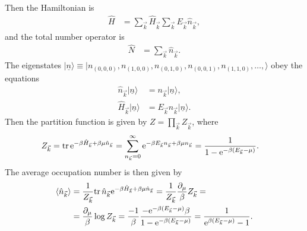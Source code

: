 \documentclass[english, parskip=full]{scrartcl}
\newcommand{\bra}{}
\newcommand{\tecxt}{}
\newcommand{\Ket}{}
\newcommand{\e}{\text{e}}
\begin{document}
Then the Hamiltonian is
\begin{align}
\hat{H} &= \sum_{\vec{k}} \hat{H}_{\vec{k}} \sum_{\vec{k}} E_{\vec{k}} \hat{n}_{\vec{k}},
\end{align}
and the total number operator is
\begin{align}
\hat{N} &= \sum_{\vec{k}} \hat{n}_{\vec{k}}.
\end{align}
The eigenstates $\Ket | \underline{n} \rangle \equiv \Ket | n_{(0,0,0)}, n_{(1,0,0)}, n_{(0,1,0)}, n_{(0,0,1)}, n_{(1,1,0)}, \dots, \rangle$ obey the equations
\begin{align}
\hat{n}_{\vec{k}} \Ket | \underline{n} \rangle &= n_{\vec{k}} \Ket | \underline{n} \rangle,\\
\hat{H}_{\vec{k}} \Ket | \underline{n} \rangle &= E_{\vec{k}} n_{\vec{k}} \Ket | \underline{n} \rangle.
\end{align}
Then the partition function is given by $Z = \prod_{\vec{k}}  Z_{\vec{k}}$, where 
\begin{align}
Z_{\vec{k}} &= \tecxt\text{tr\,} \e^{-\beta\hat{H}_{\vec{k}} + \beta\mu\hat{n}_{\vec{k}}} = \sum_{n_{\vec{k}} = 0}^\infty  \e^{-\beta E_{\vec{k}} n_{\vec{k}} + \beta\mu n_{\vec{k}}} = \frac{1}{1 - \e^{-\beta (E_{\vec{k}} - \mu )}}.
\end{align}
The average occupation number is then given by
\begin{align}
\bra\langle \hat{n}_{\vec{k}} \rangle &= \frac{1}{Z_{\vec{k}}} \tecxt\text{tr\,} \hat{n}_{\vec{k}} \e^{-\beta\hat{H}_{\vec{k}} + \beta\mu\hat{n}_{\vec{k}}} = \frac{1}{Z_{\vec{k}}} \frac{\partial_\mu }{\beta} Z_{\vec{k}} = \\
&= \frac{\partial_\mu }{\beta} \log Z_{\vec{k}} = \frac{-1}{\beta} \frac{-\e^{-\beta (E_{\vec{k}} - \mu )} \beta}{1 - \e^{-\beta (E_{\vec{k}} - \mu )}} = \frac{1}{\e^{\beta (E_{\vec{k}} - \mu )} - 1}.
\end{align}
\end{document}
